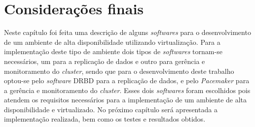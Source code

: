

\section{Considerações finais}

Neste capítulo foi feita uma descrição de alguns \textit{softwares} para o desenvolvimento de um ambiente de alta disponibilidade utilizando 
virtualização. Para a implementação deste tipo de ambiente dois tipos de \textit{softwares} tornam-se necessários, um para a replicação de dados 
e outro para gerência e monitoramento do \textit{cluster}, sendo que para o desenvolvimento deste trabalho optou-se pelo \textit{software} 
\ac{DRBD} para a replicação de dados, e pelo \textit{Pacemaker} para a gerência e monitoramento do \textit{cluster}. 
Esses dois \textit{softwares} foram escolhidos pois atendem os requisitos necessários para a implementação de um ambiente de
alta disponibilidade e virtualizado. 
No próximo capítulo será apresentada a implementação realizada, bem como os testes e resultados obtidos.
